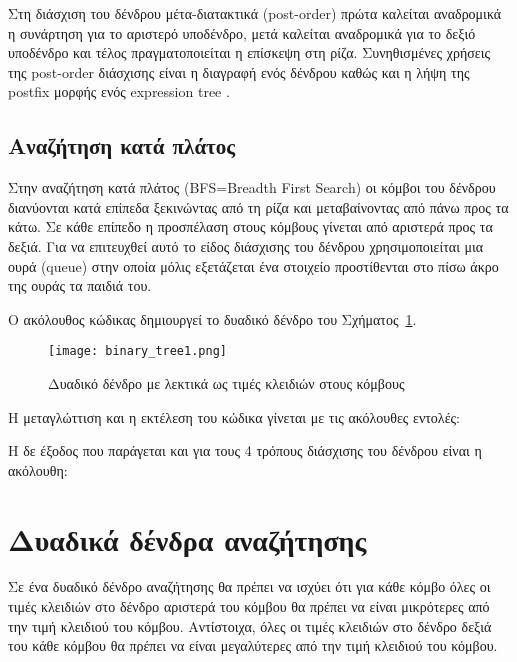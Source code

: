 Στη διάσχιση του δένδρου μέτα-διατακτικά (post-order) πρώτα καλείται αναδρομικά η  συνάρτηση για το αριστερό υποδένδρο, μετά καλείται αναδρομικά για το δεξιό υποδένδρο και τέλος πραγματοποιείται η επίσκεψη στη ρίζα. 
Συνηθισμένες χρήσεις της post-order διάσχισης είναι η διαγραφή ενός δένδρου καθώς και η λήψη της postfix μορφής ενός expression tree \cite{wikipedia_reverse_polish_notation}.

\subsection{Αναζήτηση κατά πλάτος}

Στην αναζήτηση κατά πλάτος (BFS=Breadth First Search) οι κόμβοι του δένδρου διανύονται κατά επίπεδα ξεκινώντας από τη ρίζα και μεταβαίνοντας από πάνω προς τα κάτω. Σε κάθε επίπεδο η προσπέλαση στους κόμβους γίνεται από αριστερά προς τα δεξιά. Για να επιτευχθεί αυτό το είδος διάσχισης του δένδρου χρησιμοποιείται μια ουρά (queue) στην οποία μόλις εξετάζεται ένα στοιχείο προστίθενται στο πίσω άκρο της ουράς τα παιδιά του.





Ο ακόλουθος κώδικας δημιουργεί το δυαδικό δένδρο του Σχήματος~\ref{fig:binary_tree1}.

\begin{figure}[htbp]
  \centering
  \texttt{[image: binary\_tree1.png]}
  \caption{Δυαδικό δένδρο με λεκτικά ως τιμές κλειδιών στους κόμβους}
  \label{fig:binary_tree1}
\end{figure}



Η μεταγλώττιση και η εκτέλεση του κώδικα γίνεται με τις ακόλουθες εντολές:



Η δε έξοδος που παράγεται και για τους 4 τρόπους διάσχισης του δένδρου είναι η ακόλουθη:




\section{Δυαδικά δένδρα αναζήτησης}
\label{bst}
Σε ένα δυαδικό δένδρο αναζήτησης θα πρέπει να ισχύει ότι για κάθε κόμβο όλες οι τιμές κλειδιών στο δένδρο αριστερά του κόμβου θα πρέπει να είναι μικρότερες από την τιμή κλειδιού του κόμβου. Αντίστοιχα, όλες οι τιμές κλειδιών στο δένδρο δεξιά του κάθε κόμβου θα πρέπει να είναι μεγαλύτερες από την τιμή κλειδιού του κόμβου.

